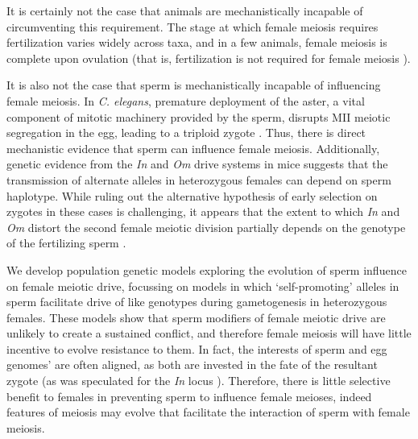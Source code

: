 \documentclass[12pt,letterpaper]{article}
\begin{document}
It is certainly not the case that animals are mechanistically incapable of circumventing this requirement.
The stage at which female meiosis requires fertilization varies widely across taxa, and in a few animals, 
	female meiosis is complete upon ovulation (that is, fertilization is not required for female meiosis \citep[see table 1 of ref 
][]{Masui_book}). 

It is also not the case that sperm is mechanistically incapable of influencing female meiosis.
In \emph{C. elegans}, premature deployment of the aster, a vital component of mitotic
machinery provided by the sperm, disrupts MII meiotic segregation
in the egg, leading to a triploid zygote \citep{McNally2012}. 
Thus, there is direct mechanistic evidence that sperm can influence female meiosis.
 Additionally, genetic evidence from the \emph{In} and \emph{Om}  drive systems in mice suggests that the 
 transmission of alternate alleles in heterozygous females can depend on sperm haplotype.  
 While ruling out the alternative hypothesis of early selection on zygotes \citep[pages
52-54][]{Burt2006} in these cases is challenging, it appears that the extent to which \emph{In} and \emph{Om} distort the second female meiotic division partially depends on the genotype of the fertilizing sperm \citep{Agulnik1993,Wu2005}.  


We develop population genetic models exploring the evolution of sperm influence on female meiotic drive, focussing on models in which `self-promoting' alleles in sperm facilitate drive of like genotypes during gametogenesis in heterozygous females.  
These models show that sperm modifiers of female meiotic drive are
unlikely to create a sustained conflict, and therefore 
female meiosis will have little incentive to evolve resistance to them.
In fact, the interests of sperm and egg  genomes' are often aligned, as both are invested in the fate of the resultant zygote (as was speculated for the \emph{In} locus \citep{Pomiankowski1993}).
Therefore, there is little selective benefit to females in preventing sperm to influence female meioses,
	indeed features of meiosis may evolve that facilitate the interaction of sperm with female meiosis. 
\end{document}
